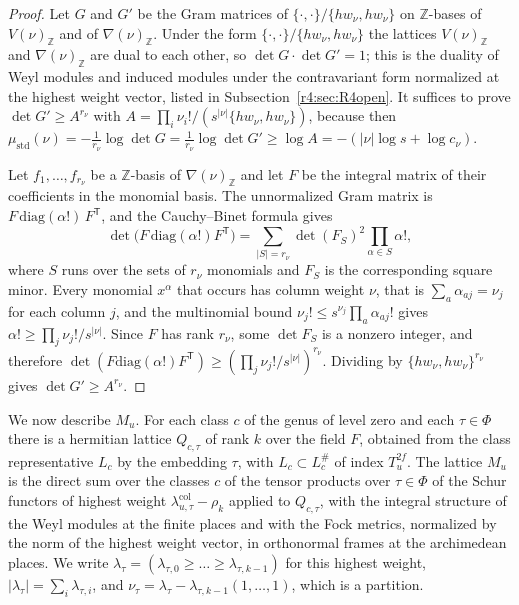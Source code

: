 \begin{proof}
Let $G$ and $G'$ be the Gram matrices of $\{\cdot,\cdot\}/\{hw_\nu,hw_\nu\}$ on $\mathbb Z$-bases of $V(\nu)_{\mathbb Z}$ and of $\nabla(\nu)_{\mathbb Z}$. Under the form $\{\cdot,\cdot\}/\{hw_\nu,hw_\nu\}$ the lattices $V(\nu)_{\mathbb Z}$ and $\nabla(\nu)_{\mathbb Z}$ are dual to each other, so $\det G\cdot\det G'=1$; this is the duality of Weyl modules and induced modules under the contravariant form normalized at the highest weight vector, listed in Subsection~\ref{r4:sec:R4open}. It suffices to prove $\det G'\ge A^{r_\nu}$ with $A=\prod_i\nu_i!/(s^{\lvert\nu\rvert}\{hw_\nu,hw_\nu\})$, because then $\mu_{\mathrm{std}}(\nu)=-\frac1{r_\nu}\log\det G=\frac1{r_\nu}\log\det G'\ge\log A=-(\lvert\nu\rvert\log s+\log c_\nu)$.

Let $f_1,\dots,f_{r_\nu}$ be a $\mathbb Z$-basis of $\nabla(\nu)_{\mathbb Z}$ and let $F$ be the integral matrix of their coefficients in the monomial basis. The unnormalized Gram matrix is $F\,\mathrm{diag}(\alpha!)\,F^{\mathsf T}$, and the Cauchy--Binet formula gives
\[
\det\big(F\,\mathrm{diag}(\alpha!)F^{\mathsf T}\big)=\sum_{\lvert S\rvert=r_\nu}\det(F_S)^2\prod_{\alpha\in S}\alpha!,
\]
where $S$ runs over the sets of $r_\nu$ monomials and $F_S$ is the corresponding square minor. Every monomial $x^\alpha$ that occurs has column weight $\nu$, that is $\sum_a\alpha_{aj}=\nu_j$ for each column $j$, and the multinomial bound $\nu_j!\le s^{\nu_j}\prod_a\alpha_{aj}!$ gives $\alpha!\ge\prod_j\nu_j!/s^{\lvert\nu\rvert}$. Since $F$ has rank $r_\nu$, some $\det F_S$ is a nonzero integer, and therefore $\det(F\mathrm{diag}(\alpha!)F^{\mathsf T})\ge(\prod_j\nu_j!/s^{\lvert\nu\rvert})^{r_\nu}$. Dividing by $\{hw_\nu,hw_\nu\}^{r_\nu}$ gives $\det G'\ge A^{r_\nu}$.
\end{proof}

We now describe $M_u$. For each class $c$ of the genus of level zero and each $\tau\in\Phi$ there is a hermitian lattice $Q_{c,\tau}$ of rank $k$ over the field $F$, obtained from the class representative $L_c$ by the embedding $\tau$, with $L_c\subset L_c^\#$ of index $T_u^{2f}$. The lattice $M_u$ is the direct sum over the classes $c$ of the tensor products over $\tau\in\Phi$ of the Schur functors of highest weight $\lambda^{\mathrm{col}}_{u,\tau}-\rho_k$ applied to $Q_{c,\tau}$, with the integral structure of the Weyl modules at the finite places and with the Fock metrics, normalized by the norm of the highest weight vector, in orthonormal frames at the archimedean places. We write $\lambda_\tau=(\lambda_{\tau,0}\ge\dots\ge\lambda_{\tau,k-1})$ for this highest weight, $\lvert\lambda_\tau\rvert=\sum_i\lambda_{\tau,i}$, and $\nu_\tau=\lambda_\tau-\lambda_{\tau,k-1}(1,\dots,1)$, which is a partition.


